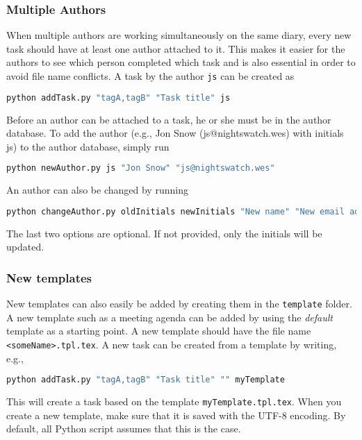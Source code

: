 \subsubsection*{Multiple Authors}
When multiple authors are working simultaneously on the same diary, every new task should have at least one author attached to it. This makes it easier for the authors to see which person completed which task and is also essential in order to avoid file name conflicts. A task by the author {\tt js} can be created as
\begin{lstlisting}[language=bash]
python addTask.py "tagA,tagB" "Task title" js
\end{lstlisting}
Before an author can be attached to a task, he or she must be in the author database. To add the author (e.g., Jon Snow (js@nightswatch.wes) with initials js) to the author database, simply run
\begin{lstlisting}[language=bash]
python newAuthor.py js "Jon Snow" "js@nightswatch.wes"
\end{lstlisting}
An author can also be changed by running
\begin{lstlisting}[language=bash]
python changeAuthor.py oldInitials newInitials "New name" "New email address"
\end{lstlisting}
The last two options are optional. If not provided, only the initials will be updated.

\subsubsection*{New templates}
New templates can also easily be added by creating them in the {\tt template} folder. A new template such as a meeting agenda can be added by using the \textit{default} template as a starting point. A new template should have the file name {\tt <someName>.tpl.tex}. A new task can be created from a template by writing, e.g.,
\begin{lstlisting}[language=bash]
python addTask.py "tagA,tagB" "Task title" "" myTemplate
\end{lstlisting}
This will create a task based on the template {\tt myTemplate.tpl.tex}. When you create a new template, make sure that it is saved with the UTF-8 encoding. By default, all Python script assumes that this is the case.

